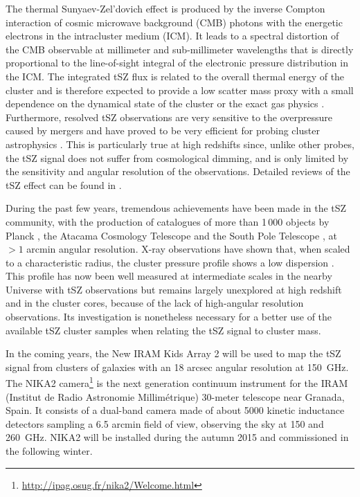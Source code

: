 \documentclass[twocolumn,traditabstract]{aa}
\begin{document}
The thermal Sunyaev-Zel'dovich effect \citep[tSZ,][]{sunyaev1972,sunyaev1980} is produced by the inverse Compton interaction of cosmic microwave background (CMB) photons with the energetic electrons in the intracluster medium (ICM). It leads to a spectral distortion of the CMB observable at millimeter and sub-millimeter wavelengths that is directly proportional to the line-of-sight integral of the electronic pressure distribution in the ICM. The integrated tSZ flux is related to the overall thermal energy of the cluster and is therefore expected to provide a low scatter mass proxy with a small dependence on the dynamical state of the cluster or the exact gas physics \citep[e.g.][]{dasilva2004,motl2005,nagai2006}. Furthermore, resolved tSZ observations are very sensitive to the overpressure caused by mergers and have proved to be very efficient for probing cluster astrophysics \citep[see for example results by][]{pointecouteau1999,komatsu2001,korngut2011,adam2013,young2014,adam2014,mroczkowski2015}. This is particularly true at high redshifts since, unlike other probes, the tSZ signal does not suffer from cosmological dimming, and is only limited by the sensitivity and angular resolution of the observations. Detailed reviews of the tSZ effect can be found in \cite{birkinshaw1999,carlstrom2002,kitayama2014}.

During the past few years, tremendous achievements have been made in the tSZ community, with the production of catalogues of more than 1\,000 objects by Planck \citep{planck2013catalogue}, the Atacama Cosmology Telescope \citep[ACT,][]{hasselfield2013} and the South Pole Telescope \citep[SPT,][]{reichardt2013,bleem2014}, at $>1$ arcmin angular resolution. X-ray observations have shown that, when  scaled to a characteristic radius, the cluster pressure profile shows a low dispersion \citep{arnaud2010}. This profile has now been well measured at intermediate scales in the nearby Universe with tSZ observations \citep{planck2013pressure_profile,sayers2013b} but remains largely unexplored at high redshift and in the cluster cores, because of the lack of high-angular resolution observations. Its investigation is nonetheless necessary for a better use of the available tSZ cluster samples when relating the tSZ signal to cluster mass.

In the coming years, the New IRAM Kids Array 2 \citep[NIKA2][]{monfardini2014} will be used to map the tSZ signal from clusters of galaxies with an 18 arcsec angular resolution at 150~GHz. The NIKA2 camera\footnote{\url{http://ipag.osug.fr/nika2/Welcome.html}} is the next generation continuum instrument for the IRAM (Institut de Radio Astronomie Millim\'etrique) 30-meter telescope near Granada, Spain. It consists of a dual-band camera made of about 5000 kinetic inductance detectors sampling a 6.5 arcmin field of view, observing the sky at 150 and 260~GHz. NIKA2 will be installed during the autumn 2015 and commissioned in the following winter. 
\end{document}
